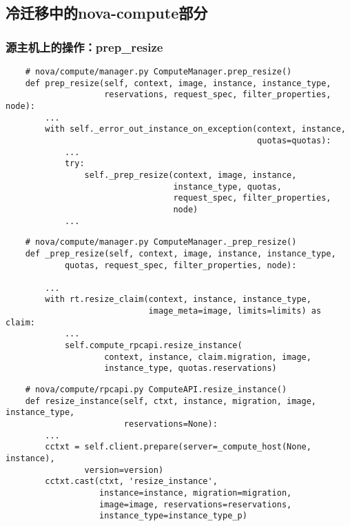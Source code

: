 \documentclass[a4paper,left=1.5cm,right=1.5cm,11pt]{article}
\begin{document}
\subsection{冷迁移中的nova-compute部分}
\subsubsection{源主机上的操作：prep\_resize}
	\begin{lstlisting}
	# nova/compute/manager.py ComputeManager.prep_resize()
	def prep_resize(self, context, image, instance, instance_type,
                    reservations, request_spec, filter_properties, node):
        ...
        with self._error_out_instance_on_exception(context, instance,
                                                   quotas=quotas):
            ...
            try:
                self._prep_resize(context, image, instance,
                                  instance_type, quotas,
                                  request_spec, filter_properties,
                                  node)
			...
	\end{lstlisting}

	\begin{lstlisting}
	# nova/compute/manager.py ComputeManager._prep_resize()
	def _prep_resize(self, context, image, instance, instance_type,
            quotas, request_spec, filter_properties, node):

        ...
        with rt.resize_claim(context, instance, instance_type,
                             image_meta=image, limits=limits) as claim:
			...
            self.compute_rpcapi.resize_instance(
                    context, instance, claim.migration, image,
                    instance_type, quotas.reservations)
	\end{lstlisting}

	\begin{lstlisting}
	# nova/compute/rpcapi.py ComputeAPI.resize_instance()
	def resize_instance(self, ctxt, instance, migration, image, instance_type,
                        reservations=None):
        ...
        cctxt = self.client.prepare(server=_compute_host(None, instance),
                version=version)
        cctxt.cast(ctxt, 'resize_instance',
                   instance=instance, migration=migration,
                   image=image, reservations=reservations,
                   instance_type=instance_type_p)
	\end{lstlisting}
\end{document}

